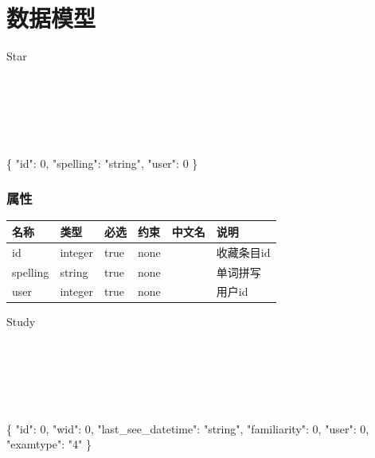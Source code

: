\documentclass[
]{article}
\newenvironment{Shaded}{}{}
\newcommand{\DataTypeTok}[1]{\textcolor[rgb]{0.56,0.13,0.00}{#1}}
\newcommand{\DecValTok}[1]{\textcolor[rgb]{0.25,0.63,0.44}{#1}}
\newcommand{\FunctionTok}[1]{\textcolor[rgb]{0.02,0.16,0.49}{#1}}
\newcommand{\StringTok}[1]{\textcolor[rgb]{0.25,0.44,0.63}{#1}}
\begin{document}
\hypertarget{ux6570ux636eux6a21ux578b}{%
\section{数据模型}\label{ux6570ux636eux6a21ux578b}}

Star

\strut \\
\strut \\
\strut \\

\begin{Shaded}
\begin{Highlighting}[]
\FunctionTok{\{}
  \DataTypeTok{"id"}\FunctionTok{:} \DecValTok{0}\FunctionTok{,}
  \DataTypeTok{"spelling"}\FunctionTok{:} \StringTok{"string"}\FunctionTok{,}
  \DataTypeTok{"user"}\FunctionTok{:} \DecValTok{0}
\FunctionTok{\}}
\end{Highlighting}
\end{Shaded}

\hypertarget{ux5c5eux6027-1}{%
\subsubsection{属性}\label{ux5c5eux6027-1}}

\begin{longtable}[]{@{}llllll@{}}
\toprule
名称 & 类型 & 必选 & 约束 & 中文名 & 说明 \\
\midrule
\endhead
id & integer & true & none & & 收藏条目id \\
spelling & string & true & none & & 单词拼写 \\
user & integer & true & none & & 用户id \\
\bottomrule
\end{longtable}

Study

\strut \\
\strut \\
\strut \\

\begin{Shaded}
\begin{Highlighting}[]
\FunctionTok{\{}
  \DataTypeTok{"id"}\FunctionTok{:} \DecValTok{0}\FunctionTok{,}
  \DataTypeTok{"wid"}\FunctionTok{:} \DecValTok{0}\FunctionTok{,}
  \DataTypeTok{"last\_see\_datetime"}\FunctionTok{:} \StringTok{"string"}\FunctionTok{,}
  \DataTypeTok{"familiarity"}\FunctionTok{:} \DecValTok{0}\FunctionTok{,}
  \DataTypeTok{"user"}\FunctionTok{:} \DecValTok{0}\FunctionTok{,}
  \DataTypeTok{"examtype"}\FunctionTok{:} \StringTok{"4"}
\FunctionTok{\}}
\end{Highlighting}
\end{Shaded}
\end{document}
